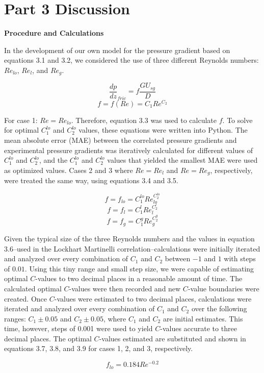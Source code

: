 \documentclass[10pt]{article}
\begin{document}
\section{Part 3 Discussion}

\textbf{Procedure and Calculations}

In the development of our own model for the pressure gradient based on equations 3.1 and 3.2, we considered the use of three different Reynolds numbers: \(Re_{lo}\), \(Re_l\), and \(Re_g\). 

\[\frac{dp}{dz}_{fric}=f\frac{GU_{sg}}{D}\]
\[f=f(Re)=C_1Re^{C_2}\]

For case 1: \(Re=Re_{lo}\). Therefore, equation 3.3 was used to calculate \(f\). To solve for optimal \(C_1^{lo}\) and \(C_2^{lo}\) values, these equations were written into Python. The mean absolute error (MAE) between the correlated pressure gradients and experimental pressure gradients was iteratively calculated for different values of \(C_1^{lo}\) and \(C_2^{lo}\), and the \(C_1^{lo}\) and \(C_2^{lo}\) values that yielded the smallest MAE were used as optimized values. Cases 2 and 3 where \(Re=Re_l\) and \(Re=Re_g\), respectively, were treated the same way, using equations 3.4 and 3.5.

\[f=f_{lo} = C_1^{lo}Re_{lo}^{C_2^{lo}}\]
\[f=f_l = C_1^lRe_l^{C_2^l}\]
\[f=f_g = C_1^gRe_g^{C_2^g}\]

Given the typical size of the three Reynolds numbers and the values in equation 3.6--used in the Lockhart Martinelli correlation--calculations were initially iterated and analyzed over every combination of \(C_1\) and \(C_2\) between \(-1\) and \(1\) with steps of \(0.01\). Using this tiny range and small step size, we were capable of estimating optimal \(C\)-values to two decimal places in a reasonable amount of time. The calculated optimal \(C\)-values were then recorded and new \(C\)-value boundaries were created. Once \(C\)-values were estimated to two decimal places, calculations were iterated and analyzed over every combination of \(C_1\) and \(C_2\) over the following ranges: \(C_1\pm 0.05\) and \(C_2\pm 0.05\), where \(C_1\) and \(C_2\) are initial estimates. This time, however, steps of 0.001 were used to yield \(C\)-values accurate to three decimal places. The optimal \(C\)-values estimated are substituted and shown in equations 3.7, 3.8, and 3.9 for cases 1, 2, and 3, respectively.

\[f_{lo}=0.184Re^{-0.2}\]
\end{document}

